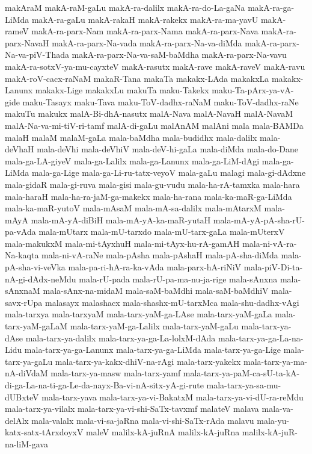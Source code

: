 {makAraM
makA-raM-gaLu
makA-ra-dalilx
makA-ra-do-La-gaNa
makA-ra-ga-LiMda
makA-ra-gaLu
makA-rakaH
makA-rakekx
makA-ra-ma-yavU
makA-rameV
makA-ra-parx-Nam
makA-ra-parx-Nama
makA-ra-parx-Nava
makA-ra-parx-NavaH
makA-ra-parx-Na-vada
makA-ra-parx-Na-va-diMda
makA-ra-parx-Na-va-piV-Thada
makA-ra-parx-Na-va-saM-baMdha
makA-ra-parx-Na-vavu
makA-ra-sotxV-ya-mu-cayxteV
makA-rasutx
makA-rave
makA-raveV
makA-ravu
makA-roV-cacx-raNaM
makaR-Tana
makaTa
makakx-LAda
makakxLa
makakx-Lanunx
makakx-Lige
makakxLu
makuTa
maku-Takekx
maku-Ta-pArx-ya-vA-gide
maku-Tasayx
maku-Tava
maku-ToV-dadhx-raNaM
maku-ToV-dadhx-raNe
makuTu
makukx
malA-Bi-dhA-nasutx
malA-Nava
malA-NavaH
malA-NavaM
malA-Na-va-mi-tiV-ri-tamf
malA-di-gaLu
malAnAM
malAni
mala
mala-BAMDa
malaH
malaM
malaM-gaLa
mala-baMdha
mala-budidhx
mala-dalilx
mala-deVhaH
mala-deVhi
mala-deVhiV
mala-deV-hi-gaLa
mala-diMda
mala-do-Dane
mala-ga-LA-giyeV
mala-ga-Lalilx
mala-ga-Lanunx
mala-ga-LiM-dAgi
mala-ga-LiMda
mala-ga-Lige
mala-ga-Li-ru-tatx-veyoV
mala-gaLu
malagi
mala-gi-dAdxne
mala-gidaR
mala-gi-ruva
mala-gisi
mala-gu-vudu
mala-ha-rA-tamxka
mala-hara
mala-haraH
mala-ha-ra-jaM-ga-makekx
mala-ha-rana
mala-ka-maR-ga-LiMda
mala-ka-maR-yutoV
mala-mAsaM
mala-mA-sa-dalilx
mala-mAtarxM
mala-mAyA
mala-mA-yA-diBiH
mala-mA-yA-ka-maR-yutaH
mala-mA-yA-pA-sha-rU-pa-vAda
mala-mUtarx
mala-mU-tarxdo
mala-mU-tarx-gaLa
mala-mUterxV
mala-makukxM
mala-mi-tAyxhuH
mala-mi-tAyx-hu-rA-gamAH
mala-ni-vA-ra-Na-kaqta
mala-ni-vA-raNe
mala-pAsha
mala-pAshaH
mala-pA-sha-diMda
mala-pA-sha-vi-veVka
mala-pa-ri-hA-ra-ka-vAda
mala-parx-hA-riNiV
mala-piV-Di-ta-nA-gi-dAdx-neMdu
mala-rU-pada
mala-rU-pa-ma-nu-ja-rige
mala-sAnxna
mala-sAnxnaM
mala-sAnx-na-midaM
mala-saM-baMdhi
mala-saM-baMdhiV
mala-savx-rUpa
malasayx
malashacx
mala-shashx-mU-tarxMca
mala-shu-dadhx-vAgi
mala-tarxya
mala-tarxyaM
mala-tarx-yaM-ga-LAse
mala-tarx-yaM-gaLa
mala-tarx-yaM-gaLaM
mala-tarx-yaM-ga-Lalilx
mala-tarx-yaM-gaLu
mala-tarx-ya-dAse
mala-tarx-ya-dalilx
mala-tarx-ya-ga-La-lolxM-dAda
mala-tarx-ya-ga-La-na-Lidu
mala-tarx-ya-ga-Lanunx
mala-tarx-ya-ga-LiMda
mala-tarx-ya-ga-Lige
mala-tarx-ya-gaLu
mala-tarx-ya-kakx-dhiV-na-rAgi
mala-tarx-yakekx
mala-tarx-ya-ma-nA-diVdaM
mala-tarx-ya-masw
mala-tarx-yamf
mala-tarx-ya-paM-ca-sU-ta-kA-di-ga-La-na-ti-ga-Le-da-nayx-Ba-vi-nA-sitx-yA-gi-rute
mala-tarx-ya-sa-mu-dUBxteV
mala-tarx-yava
mala-tarx-ya-vi-BakatxM
mala-tarx-ya-vi-dU-ra-reMdu
mala-tarx-ya-vilalx
mala-tarx-ya-vi-shi-SaTx-tavxmf
malateV
malava
mala-va-delAlx
mala-valalx
mala-vi-sa-jaRna
mala-vi-shi-SaTx-rAda
malavu
mala-yu-katx-satx-tArxdoyxV
maleV
malilx-kA-juRnA
malilx-kA-juRna
malilx-kA-juR-na-liM-gava
}
